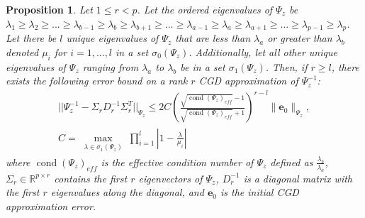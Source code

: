 \documentclass[10pt,a4paper]{amsart}
\newtheorem{proposition}{Proposition}
\newcommand{\vect}[1]{\ensuremath{\bm{#1}}}
\begin{document}
\begin{proposition}
Let $1\leq r<p$.  Let the ordered eigenvalues of 
    $\Psi_{z}$ be $\lambda_1 \geq \lambda_2 \geq ...\geq \lambda_{b-1} \geq \lambda_b \geq \lambda_{b+1} \geq  ... \geq \lambda_{a-1} \geq \lambda_a \geq \lambda_{a+1} \geq  ... \geq \lambda_{p-1} \geq \lambda_p$. Let there be $l$ unique eigenvalues of $\Psi_{z}$ that are less than $\lambda_a$ or greater than $\lambda_b$ denoted $\mu_i$ for $i=1,...,l$ in a set $\sigma_0(\Psi_{z})$.  Additionally, let all other unique eigenvalues of $\Psi_{z}$ ranging from $\lambda_a$ to $\lambda_b$ be in a set $\sigma_1(\Psi_{z})$.  Then, if $r \geq l$, there exists the following error bound on a rank $r$ CGD approximation of $\Psi_{z}^{-1}$:
    \begin{align}
    ||\Psi_{z}^{-1} - \Sigma_r D_r^{-1} \Sigma_r^T||_{\Psi_{z}} \leq 2C(\frac{\sqrt{\operatorname{cond}(\Psi_{z})_{eff}} - 1}{\sqrt{\operatorname{cond}(\Psi_{z})_{eff}} +1})^{r-l} \| \vect{e}_0\|_{\Psi_{z}}, \\
    C = \max\limits_{\substack{\lambda \in \sigma_1(\Psi_{z})}} \prod_{i=1}^{l} | 1-\frac{\lambda}{\mu_i}|
    \end{align}
where $\operatorname{cond}(\Psi_{z})_{eff}$ is the effective condition number of $\Psi_{z}$ defined as $\frac{\lambda_b}{\lambda_a}$, $\Sigma_r \in \mathbb{R}^{p \times r}$ contains the first $r$ eigenvectors of $\Psi_{z}$, $D_r^{-1}$ is a diagonal matrix with the first $r$ eigenvalues along the diagonal, and $\vect{e}_0$ is the initial CGD approximation error.
\label{prop:3}
\end{proposition}
\end{document}
